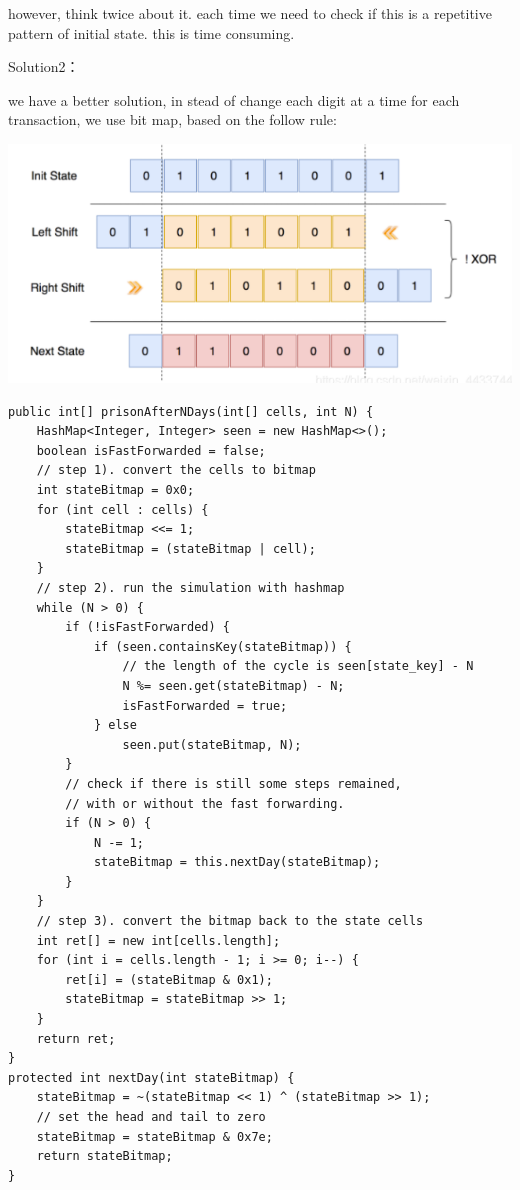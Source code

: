 \documentclass[9pt, b5paper]{article}
\begin{document}
however, think twice about it. each time we need to check if this is a repetitive pattern of initial state. this is time consuming.

Solution2：

we have a better solution, in stead of change each digit at a time for each transaction, we use bit map, based on the follow rule:

\includegraphics[width=.9\linewidth]{./pic/prisonCell.png}

\begin{verbatim}
public int[] prisonAfterNDays(int[] cells, int N) {
    HashMap<Integer, Integer> seen = new HashMap<>();
    boolean isFastForwarded = false;
    // step 1). convert the cells to bitmap
    int stateBitmap = 0x0;
    for (int cell : cells) {
        stateBitmap <<= 1;
        stateBitmap = (stateBitmap | cell);
    }
    // step 2). run the simulation with hashmap
    while (N > 0) {
        if (!isFastForwarded) {
            if (seen.containsKey(stateBitmap)) {
                // the length of the cycle is seen[state_key] - N
                N %= seen.get(stateBitmap) - N;
                isFastForwarded = true;
            } else
                seen.put(stateBitmap, N);
        }
        // check if there is still some steps remained,
        // with or without the fast forwarding.
        if (N > 0) {
            N -= 1;
            stateBitmap = this.nextDay(stateBitmap);
        }
    }
    // step 3). convert the bitmap back to the state cells
    int ret[] = new int[cells.length];
    for (int i = cells.length - 1; i >= 0; i--) {
        ret[i] = (stateBitmap & 0x1);
        stateBitmap = stateBitmap >> 1;
    }
    return ret;
}
protected int nextDay(int stateBitmap) {
    stateBitmap = ~(stateBitmap << 1) ^ (stateBitmap >> 1);
    // set the head and tail to zero
    stateBitmap = stateBitmap & 0x7e;
    return stateBitmap;
}
\end{verbatim}
\end{document}
